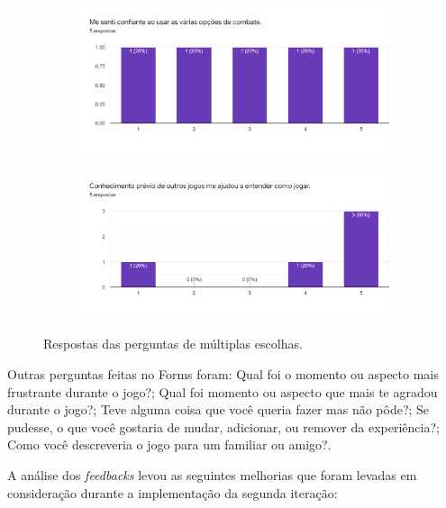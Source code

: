 \begin{figure}[h!]
\begin{subfigure}[b]{0.49\linewidth}
  \end{subfigure}
  \begin{subfigure}[b]{0.49\linewidth}
    \includegraphics[width=\linewidth]{forms9.png}
  \end{subfigure}
  \begin{subfigure}[b]{0.49\linewidth}
    \includegraphics[width=\linewidth]{forms10.png}
  \end{subfigure}
  \caption{Respostas das perguntas de múltiplas escolhas.}
  \label{fig:feedback}
\end{figure}

	Outras perguntas feitas no Forms foram: Qual foi o momento ou aspecto mais frustrante durante o jogo?; Qual foi momento ou aspecto que mais te agradou durante o jogo?; Teve alguma coisa que você queria fazer mas não pôde?; Se pudesse, o que você gostaria de mudar, adicionar, ou remover da experiência?; Como você descreveria o jogo para um familiar ou amigo?.
	
	A análise dos \emph{feedbacks} levou as seguintes melhorias que foram levadas em consideração durante a implementação da segunda iteração:

